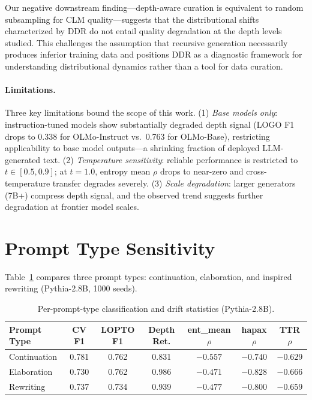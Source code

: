 \documentclass[11pt,a4paper]{article}
\begin{document}
Our negative downstream finding---depth-aware curation is equivalent to random subsampling for CLM quality---suggests that the distributional shifts characterized by DDR do not entail quality degradation at the depth levels studied. This challenges the assumption that recursive generation necessarily produces inferior training data and positions DDR as a diagnostic framework for understanding distributional dynamics rather than a tool for data curation.

\paragraph{Limitations.} Three key limitations bound the scope of this work. (1) \emph{Base models only}: instruction-tuned models show substantially degraded depth signal (LOGO F1 drops to 0.338 for OLMo-Instruct vs.\ 0.763 for OLMo-Base), restricting applicability to base model outputs---a shrinking fraction of deployed LLM-generated text. (2) \emph{Temperature sensitivity}: reliable performance is restricted to $t \in [0.5, 0.9]$; at $t = 1.0$, entropy mean $\rho$ drops to near-zero and cross-temperature transfer degrades severely. (3) \emph{Scale degradation}: larger generators (7B+) compress depth signal, and the observed trend suggests further degradation at frontier model scales.

\appendix

\section{Prompt Type Sensitivity}
\label{app:prompt}

Table~\ref{tab:prompt_type} compares three prompt types: continuation, elaboration, and inspired rewriting (Pythia-2.8B, 1000 seeds).

\begin{table}[h]
\centering
\small
\caption{Per-prompt-type classification and drift statistics (Pythia-2.8B).}
\label{tab:prompt_type}
\begin{tabular}{lcccccc}
\toprule
Prompt Type & CV F1 & LOPTO F1 & Depth Ret. & ent\_mean $\rho$ & hapax $\rho$ & TTR $\rho$ \\
\midrule
Continuation & 0.781 & 0.762 & 0.831 & $-0.557$ & $-0.740$ & $-0.629$ \\
Elaboration & 0.730 & 0.762 & 0.986 & $-0.471$ & $-0.828$ & $-0.666$ \\
Rewriting & 0.737 & 0.734 & 0.939 & $-0.477$ & $-0.800$ & $-0.659$ \\
\bottomrule
\end{tabular}
\end{table}
\end{document}
